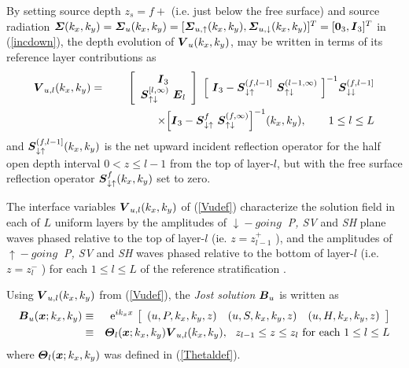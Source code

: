 By setting source depth $z_s=f+$ (i.e. just below the free surface) and  
source radiation ${\mbox{\boldmath$\mit \Sigma$\unboldmath}}(k_{x},k_{y})={\mbox{\boldmath$\mit \Sigma$\unboldmath}}_{u}
(k_{x},k_{y})=[{\mbox{\boldmath$\mit \Sigma$\unboldmath}}_{u,\uparrow}(k_{x},k_{y}),{\mbox{\boldmath$\mit \Sigma$\unboldmath}}_{u,\downarrow}
(k_{x},k_{y})]^{T}=
[{\bf 0}_{3 },{\mbox{\boldmath$\mit I$\unboldmath}}_{3 }]^{T}$  in (\ref{incdown}), 
the depth evolution of ${\mbox{\boldmath$\mit V$\unboldmath}}_{u}(k_{x},k_{y})$, may be written in terms of its reference layer 
contributions as
\begin{eqnarray} \label{Vudef} 
{{\mbox{\boldmath$\mit V$\unboldmath}}}_{u,l}(k_{x},k_{y})&=&
\left[\begin{array}{c}
{\mbox{\boldmath$\mit I$\unboldmath}}_{3 }\\ 
{\mbox{\boldmath$\mit S$\unboldmath}}{}_{\uparrow \downarrow }^{ [l , \infty)}
 \ {{\mbox{\boldmath$\mit E$\unboldmath}}}_{l}\end{array}\right] 
\ {\left[{ \ {\mbox{\boldmath$\mit I$\unboldmath}}_{3 }-
{\mbox{\boldmath$\mit S$\unboldmath}}{}_{\downarrow \uparrow }^{ (f , l-1]} \ {\mbox{\boldmath$\mit S$\unboldmath}}{}_{ \uparrow 
\downarrow }^{ (l-1 , \infty)} \ }\right]}^{  - 1}
{\mbox{\boldmath$\mit S$\unboldmath}}{}_{\downarrow \downarrow }^{ (f , l-1]} \nonumber\\
&& \qquad \qquad \times  {\left[{ {\mbox{\boldmath$\mit I$\unboldmath}}_{3 } 
- {\mbox{\boldmath$\mit S$\unboldmath}}{}_{ \downarrow \uparrow }^{ f} \ {\mbox{\boldmath$\mit S$\unboldmath}}{}_{\uparrow \downarrow 
}^{(f, \infty)}  }\right]}^{ - 1}(k_{x},k_{y}),\qquad 1 \le l \le L
\end{eqnarray}
and ${\mbox{\boldmath$\mit S$\unboldmath}}{}_{\downarrow \uparrow }^{ (f , l-1]}(k_{x},k_{y})$ is the net upward 
incident reflection operator for the half open depth interval
$0< z \le l-1$ from the top of layer-$l$, but with 
the free surface reflection operator 
${\mbox{\boldmath$\mit S$\unboldmath}}{}_{ \downarrow \uparrow }^{ f}(k_{x},k_{y})$ set to zero.



 
The interface variables ${\mbox{\boldmath$\mit V$\unboldmath}}_{ u,l}(k_{x},k_{y})$ of
(\ref{Vudef}) characterize the solution field in each of $L$ uniform 
layers by the amplitudes of $ \downarrow \!  \!-going\ $
 {\em P, SV\/} and {\em SH\/} plane waves phased relative to  the top of layer-$l$ (ie. 
\( z={z}_{l-1}^{+}\) ), and the amplitudes of
\(  \uparrow \!  
\!-going\ \) 
{\em P, SV\/} and {\em SH\/} waves phased 
relative to the bottom of layer-$l$ (i.e.
\(z={z}_{l}^{-}\) ) for each   $1 \le    l \le   L$
 of the reference stratification .


Using ${\mbox{\boldmath$\mit V$\unboldmath}}_{ u,l}(k_{x},k_{y})$ from (\ref{Vudef}), the {\em 
Jost solution\/} ${\mbox{\boldmath$\mit B$\unboldmath}}_{u}$ is written as
\begin{eqnarray}\label{Budef}
{\mbox{\boldmath$\mit B$\unboldmath}}_{u}({\mbox{\boldmath$\mit x$\unboldmath}};k_{x},k_{y})
&\equiv&{\rm e}^{i{ k}_{x} x}\,
\left[\begin{array}{ccc} (u,P,k_x,k_{y},z)&(u,S,k_x,k_{y},z)
&(u,H,k_x,k_{y},z)\end{array} \right]\nonumber\\
&\equiv&{\mbox{\boldmath$\mit \Theta$\unboldmath}}_{l}({\mbox{\boldmath$\mit x$\unboldmath}};k_{x},k_{y}){{\mbox{\boldmath$\mit V$\unboldmath}}}_{u,l}(k_{x},k_{y}),
\ \  z_{l-1} \le z \le{z}_{l} \ \mbox{for each}  \ 1 \le    l \le   L
\end{eqnarray}
where ${\mbox{\boldmath$\mit \Theta$\unboldmath}}_{l}({\mbox{\boldmath$\mit x$\unboldmath}};k_{x},k_{y})$ was defined in 
(\ref{Thetaldef}).
	

